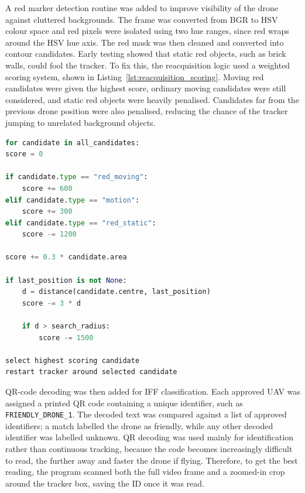 \documentclass[conference]{IEEEtran}
\begin{document}
A red marker detection routine was added to improve visibility of the drone against cluttered backgrounds. The frame was converted from BGR to HSV colour space and red pixels were isolated using two hue ranges, since red wraps around the HSV hue axis. The red mask was then cleaned and converted into contour candidates. Early testing showed that static red objects, such as brick walls, could fool the tracker. To fix this, the reacquisition logic used a weighted scoring system, shown in Listing~\ref{lst:reacquisition_scoring}. Moving red candidates were given the highest score, ordinary moving candidates were still considered, and static red objects were heavily penalised. Candidates far from the previous drone position were also penalised, reducing the chance of the tracker jumping to unrelated background objects.



\begin{minipage}{\columnwidth}
\begin{lstlisting}[language=Python, caption={Simplified candidate scoring used for tracker reacquisition.}, label={lst:reacquisition_scoring}]
for candidate in all_candidates:
score = 0

if candidate.type == "red_moving":
    score += 600
elif candidate.type == "motion":
    score += 300
elif candidate.type == "red_static":
    score -= 1200

score += 0.3 * candidate.area

if last_position is not None:
    d = distance(candidate.centre, last_position)
    score -= 3 * d

    if d > search_radius:
        score -= 1500

select highest scoring candidate
restart tracker around selected candidate
\end{lstlisting}
\end{minipage}




QR-code decoding was then added for IFF classification. Each approved UAV was assigned a printed QR code containing a unique identifier, such as \texttt{FRIENDLY\_DRONE\_1}. The decoded text was compared against a list of approved identifiers; a match labelled the drone as friendly, while any other decoded identifier was labelled unknown. QR decoding was used mainly for identification rather than continuous tracking, because the code becomes increasingly difficult to read, the further away and faster the drone if flying. Therefore, to get the best reading, the program scanned both the full video frame and a zoomed-in crop around the tracker box, saving the ID once it was read.
\end{document}
